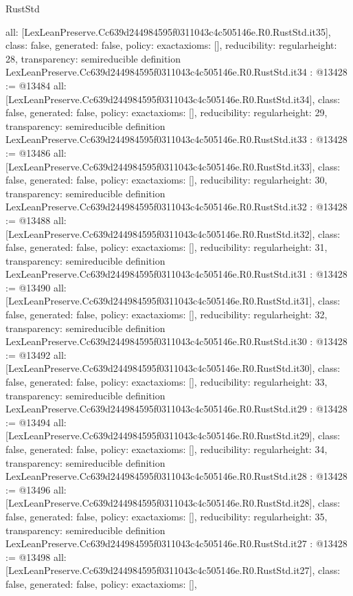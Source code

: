 \begin{lexlean}{RustStd}
\begin{coremodule}
{  all: [LexLeanPreserve.Cc639d244984595f0311043c4c505146e.R0.RustStd.it35],
  class: false,
  generated: false,
  policy: exact{axioms: []},
  reducibility: regular{height: 28},
  transparency: semireducible
}
definition LexLeanPreserve.Cc639d244984595f0311043c4c505146e.R0.RustStd.it34 : @13428 := @13484 {
  all: [LexLeanPreserve.Cc639d244984595f0311043c4c505146e.R0.RustStd.it34],
  class: false,
  generated: false,
  policy: exact{axioms: []},
  reducibility: regular{height: 29},
  transparency: semireducible
}
definition LexLeanPreserve.Cc639d244984595f0311043c4c505146e.R0.RustStd.it33 : @13428 := @13486 {
  all: [LexLeanPreserve.Cc639d244984595f0311043c4c505146e.R0.RustStd.it33],
  class: false,
  generated: false,
  policy: exact{axioms: []},
  reducibility: regular{height: 30},
  transparency: semireducible
}
definition LexLeanPreserve.Cc639d244984595f0311043c4c505146e.R0.RustStd.it32 : @13428 := @13488 {
  all: [LexLeanPreserve.Cc639d244984595f0311043c4c505146e.R0.RustStd.it32],
  class: false,
  generated: false,
  policy: exact{axioms: []},
  reducibility: regular{height: 31},
  transparency: semireducible
}
definition LexLeanPreserve.Cc639d244984595f0311043c4c505146e.R0.RustStd.it31 : @13428 := @13490 {
  all: [LexLeanPreserve.Cc639d244984595f0311043c4c505146e.R0.RustStd.it31],
  class: false,
  generated: false,
  policy: exact{axioms: []},
  reducibility: regular{height: 32},
  transparency: semireducible
}
definition LexLeanPreserve.Cc639d244984595f0311043c4c505146e.R0.RustStd.it30 : @13428 := @13492 {
  all: [LexLeanPreserve.Cc639d244984595f0311043c4c505146e.R0.RustStd.it30],
  class: false,
  generated: false,
  policy: exact{axioms: []},
  reducibility: regular{height: 33},
  transparency: semireducible
}
definition LexLeanPreserve.Cc639d244984595f0311043c4c505146e.R0.RustStd.it29 : @13428 := @13494 {
  all: [LexLeanPreserve.Cc639d244984595f0311043c4c505146e.R0.RustStd.it29],
  class: false,
  generated: false,
  policy: exact{axioms: []},
  reducibility: regular{height: 34},
  transparency: semireducible
}
definition LexLeanPreserve.Cc639d244984595f0311043c4c505146e.R0.RustStd.it28 : @13428 := @13496 {
  all: [LexLeanPreserve.Cc639d244984595f0311043c4c505146e.R0.RustStd.it28],
  class: false,
  generated: false,
  policy: exact{axioms: []},
  reducibility: regular{height: 35},
  transparency: semireducible
}
definition LexLeanPreserve.Cc639d244984595f0311043c4c505146e.R0.RustStd.it27 : @13428 := @13498 {
  all: [LexLeanPreserve.Cc639d244984595f0311043c4c505146e.R0.RustStd.it27],
  class: false,
  generated: false,
  policy: exact{axioms: []},
}
\end{coremodule}
\end{lexlean}
